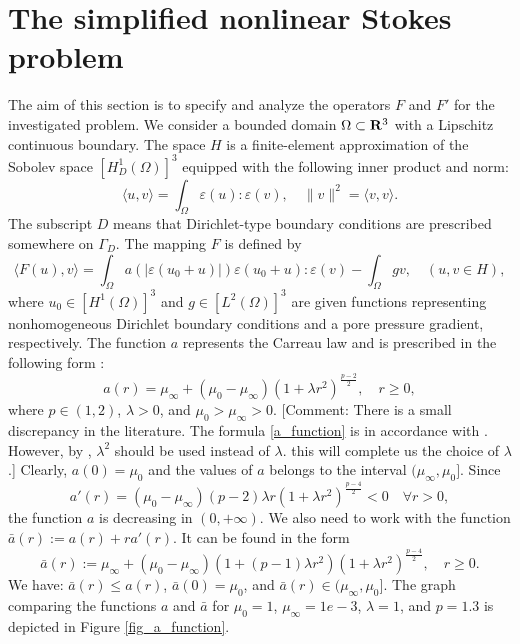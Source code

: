 \documentclass[12pt]{article}
\numberwithin{equation}{section}
\begin{document}
\section{The simplified nonlinear Stokes problem}
	\label{sec_EP}
	
The aim of this section is to specify and analyze the operators $F$ and $F'$ for the investigated problem. We consider a bounded domain $\Omega\subset{\bf R}^3$ with a Lipschitz continuous boundary. The space $H$ is a finite-element approximation of the Sobolev space $[H^1_D(\Omega)]^3$ equipped with the following inner product and norm:
$$\langle u,v \rangle=\int_{\Omega}\varepsilon(u):\varepsilon(v),\quad \|v\|^2=\langle v,v \rangle.$$ The subscript $D$ means that Dirichlet-type boundary conditions are prescribed somewhere on $\Gamma_D$. The mapping $F$ is defined by
\begin{equation}
\langle F(u),v\rangle=\int_{\Omega}a(|\varepsilon(u_0+u)|)\varepsilon(u_0+u):\varepsilon(v)-\int_\Omega gv,\quad (u,v\in H),
\end{equation}  
where $u_0\in [H^1(\Omega)]^3$ and $g\in [L^2(\Omega)]^3$ are given functions representing nonhomogeneous Dirichlet boundary conditions and a pore pressure gradient, respectively. The function $a$ represents the Carreau law and is prescribed in the following form \cite{ABS22, JMS10}:
\begin{equation}
a(r)=\mu_\infty+(\mu_0-\mu_\infty)(1+\lambda r^2)^{\frac{p-2}{2}}, \quad r\geq0,
\label{a_function}
\end{equation}
where $p\in(1,2)$, $\lambda>0$, and $\mu_0>\mu_\infty>0$. \alert{[Comment: There is a small discrepancy in the literature. The formula \eqref{a_function} is in accordance with \cite{ABS22}. However, by \cite{JMS10}, $\lambda^2$ should be used instead of $\lambda$. this will complete us the choice of $\lambda$.]} Clearly, $a(0)=\mu_0$ and the values of $a$ belongs to the interval $(\mu_\infty,\mu_0]$. Since
\begin{equation}
	a'(r)=(\mu_0-\mu_\infty)(p-2)\lambda r(1+\lambda r^2)^{\frac{p-4}{2}}<0 \quad\forall r>0,
\end{equation}
the function $a$ is decreasing in $(0,+\infty)$. We also need to work with the function $\bar a(r):=a(r)+ra'(r)$. It can be found in the form
\begin{equation}
	\bar a(r):=\mu_\infty+(\mu_0-\mu_\infty)(1+(p-1)\lambda r^2)(1+\lambda r^2)^{\frac{p-4}{2}}, \quad r\geq0.
\end{equation}
We have: $\bar a(r)\leq a(r)$, $\bar a(0)=\mu_0$, and $\bar a(r)\in(\mu_\infty,\mu_0]$.
The graph comparing the functions $a$ and $\bar a$ for $\mu_0=1$, $\mu_\infty=1e-3$, $\lambda=1$, and $p=1.3$ is depicted in Figure \ref{fig_a_function}. 
\end{document}
